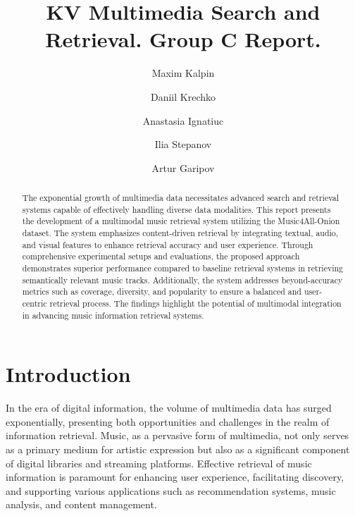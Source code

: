 \documentclass[sigconf]{acmart}
\begin{document}
\title{KV Multimedia Search and Retrieval. Group C Report.}

\author{Maxim Kalpin}

\author{Daniil Krechko}

\author{Anastasia Ignatiuc}

\author{Ilia Stepanov}

\author{Artur Garipov}

\renewcommand{\shortauthors}{Kalpin et al.}

\begin{abstract}
The exponential growth of multimedia data necessitates advanced search and retrieval systems capable of effectively handling diverse data modalities. This report presents the development of a multimodal music retrieval system utilizing the Music4All-Onion dataset. The system emphasizes content-driven retrieval by integrating textual, audio, and visual features to enhance retrieval accuracy and user experience. Through comprehensive experimental setups and evaluations, the proposed approach demonstrates superior performance compared to baseline retrieval systems in retrieving semantically relevant music tracks. Additionally, the system addresses beyond-accuracy metrics such as coverage, diversity, and popularity to ensure a balanced and user-centric retrieval process. The findings highlight the potential of multimodal integration in advancing music information retrieval systems.
\end{abstract}

\maketitle

\section{Introduction}
\label{sec:introduction}

In the era of digital information, the volume of multimedia data has surged exponentially, presenting both opportunities and challenges in the realm of information retrieval. Music, as a pervasive form of multimedia, not only serves as a primary medium for artistic expression but also as a significant component of digital libraries and streaming platforms. Effective retrieval of music information is paramount for enhancing user experience, facilitating discovery, and supporting various applications such as recommendation systems, music analysis, and content management.
\end{document}
